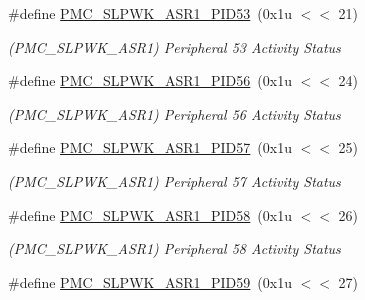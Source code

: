 \begin{DoxyCompactItemize}
\mbox{\label{group__SAMS70__PMC_ga65d68f06f2edea6a4d2b5cfa62c37227}} 
\#define \mbox{\hyperlink{group__SAMS70__PMC_ga65d68f06f2edea6a4d2b5cfa62c37227}{P\+M\+C\+\_\+\+S\+L\+P\+W\+K\+\_\+\+A\+S\+R1\+\_\+\+P\+I\+D53}}~(0x1u $<$$<$ 21)
\begin{DoxyCompactList}\small\item\em (P\+M\+C\+\_\+\+S\+L\+P\+W\+K\+\_\+\+A\+S\+R1) Peripheral 53 Activity Status \end{DoxyCompactList}\item 
\mbox{\label{group__SAMS70__PMC_ga2676e54cd88cce57d6b1ba09f7c3c866}} 
\#define \mbox{\hyperlink{group__SAMS70__PMC_ga2676e54cd88cce57d6b1ba09f7c3c866}{P\+M\+C\+\_\+\+S\+L\+P\+W\+K\+\_\+\+A\+S\+R1\+\_\+\+P\+I\+D56}}~(0x1u $<$$<$ 24)
\begin{DoxyCompactList}\small\item\em (P\+M\+C\+\_\+\+S\+L\+P\+W\+K\+\_\+\+A\+S\+R1) Peripheral 56 Activity Status \end{DoxyCompactList}\item 
\mbox{\label{group__SAMS70__PMC_ga67274aa2482ed51d2cd0e0cc6d41a1d5}} 
\#define \mbox{\hyperlink{group__SAMS70__PMC_ga67274aa2482ed51d2cd0e0cc6d41a1d5}{P\+M\+C\+\_\+\+S\+L\+P\+W\+K\+\_\+\+A\+S\+R1\+\_\+\+P\+I\+D57}}~(0x1u $<$$<$ 25)
\begin{DoxyCompactList}\small\item\em (P\+M\+C\+\_\+\+S\+L\+P\+W\+K\+\_\+\+A\+S\+R1) Peripheral 57 Activity Status \end{DoxyCompactList}\item 
\mbox{\label{group__SAMS70__PMC_ga1291144e3aa0588181e47e24603781c1}} 
\#define \mbox{\hyperlink{group__SAMS70__PMC_ga1291144e3aa0588181e47e24603781c1}{P\+M\+C\+\_\+\+S\+L\+P\+W\+K\+\_\+\+A\+S\+R1\+\_\+\+P\+I\+D58}}~(0x1u $<$$<$ 26)
\begin{DoxyCompactList}\small\item\em (P\+M\+C\+\_\+\+S\+L\+P\+W\+K\+\_\+\+A\+S\+R1) Peripheral 58 Activity Status \end{DoxyCompactList}\item 
\mbox{\label{group__SAMS70__PMC_gaae9a7012faa614368ff01d54ab17e1cd}} 
\#define \mbox{\hyperlink{group__SAMS70__PMC_gaae9a7012faa614368ff01d54ab17e1cd}{P\+M\+C\+\_\+\+S\+L\+P\+W\+K\+\_\+\+A\+S\+R1\+\_\+\+P\+I\+D59}}~(0x1u $<$$<$ 27)
$$
\end{DoxyCompactItemize}
